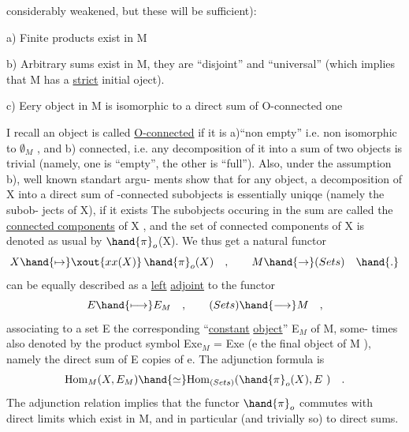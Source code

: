 considerably weakened,  but these will be sufficient):

a)  Finite products exist in M

b)  Arbitrary sums exist in M,  they are ``disjoint'' and ``universal''
(which implies that M has a \uline{strict} initial oject).

c)  Eery object in M is isomorphic to a direct sum of O-connected one

I recall an object is called \uline{O-connected} if it is  a)``non empty'' i.e.
non isomorphic to $\emptyset_M$ ,  and b) connected,  i.e. any decomposition of it
into a sum of two objects  is trivial (namely, one is ``empty'',  the other
is ``full''). Also,  under the assumption b),  well known standart argu-%
ments show that for any object, a decomposition of X into a direct sum
of -connected subobjects is essentially uniqqe (namely the   subob-%
jects of X), if it exists  The  subobjects 
occuring in the sum are called the \uline{connected components} of X ,  and the
set of connected components of X is denoted as usual by $\hand{\pi}_o$(X).  We thus
get a natural functor
\[ X \hand{\mapsto} \xout{xx(X)}\,\hand{\pi}_o(X) \quad , \qquad M \hand{\to} (Sets) \quad \hand{.} \]
 can be equally described as a \uline{left} \uline{adjoint} to the functor
\[ E \hand{\longmapsto} E_M \quad , \qquad (Sets) \hand{\longrightarrow} M \quad , \]
associating to a set E the corresponding ``\uline{constant} \uline{object}'' E$_M$ of M,  some-%
times also denoted by the product symbol Exe$_M$ = Exe  (e the final object
of M ),  namely the direct sum  of E copies of e.  The adjunction formula
is
\[ \mathrm{Hom}_M(X,E_M) \hand{\simeq} \mathrm{Hom}_{(Sets)}(\hand{\pi}_o(X),E\ ) \quad . \]
The adjunction  relation implies that  the functor $\hand{\pi}_o$  commutes
with  direct limits  which exist in M,  and in particular (and trivially so)
to direct sums.

